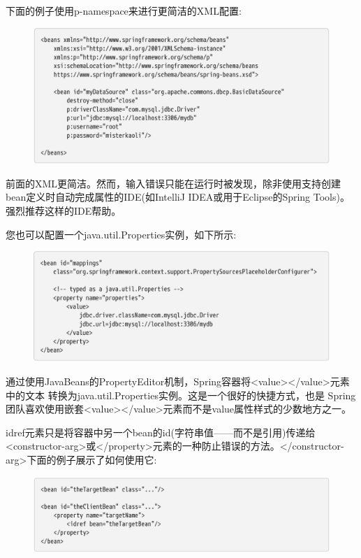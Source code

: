 下面的例子使用p-namespace来进行更简洁的XML配置:

\begin{figure}[ht]
    \centering
    \includegraphics[width=1\linewidth]{./Figure/IMG_code_33.png}
\end{figure}

前面的XML更简洁。然而，输入错误只能在运行时被发现，除非使用支持创建bean定义时自动完成属性的IDE(如IntelliJ IDEA或用于Eclipse的Spring Tools)。强烈推荐这样的IDE帮助。

您也可以配置一个java.util.Properties实例，如下所示:


\begin{figure}[ht]
    \centering
    \includegraphics[width=1\linewidth]{./Figure/IMG_code_34.png}
\end{figure}

通过使用JavaBeans的PropertyEditor机制，Spring容器将<value></value>元素中的文本
转换为java.util.Properties实例。这是一个很好的快捷方式，也是
Spring团队喜欢使用嵌套<value></value>元素而不是value属性样式的少数地方之一。

idref元素只是将容器中另一个bean的id(字符串值——而不是引用)传递给<constructor-arg>或</property>元素的一种防止错误的方法。</constructor-arg>下面的例子展示了如何使用它:

\begin{figure}[ht]
    \centering
    \includegraphics[width=1\linewidth]{./Figure/IMG_code_35.png}
\end{figure}

